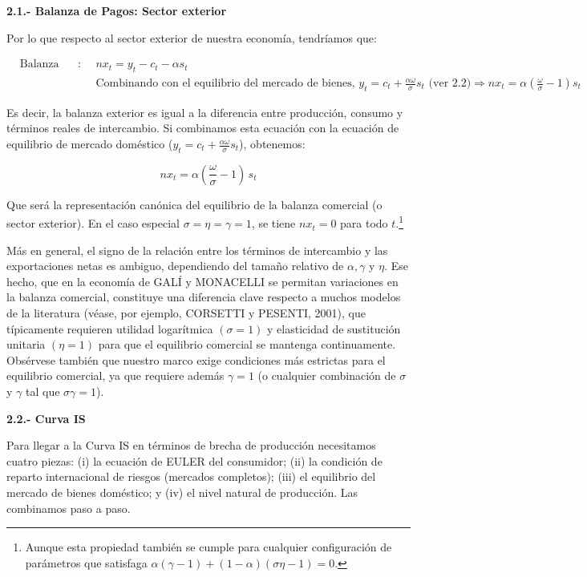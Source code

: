 \documentclass[10pt,a4paper]{article}
\begin{document}
\textbf{2.1.- Balanza de Pagos: Sector exterior}

Por lo que respecto al sector exterior de nuestra economía, tendríamos que:

$$\begin{aligned}
    &\text{Balanza comercial}:&& nx_t = y_t - c_t - \alpha s_t\\[0.5em]
    &&&\text{Combinando con el equilibrio del mercado de bienes, }y_t=c_t+\tfrac{\alpha\omega}{\sigma}s_t\text{ (ver 2.2)}\Longrightarrow \boxed{nx_t=\alpha\left(\frac{\omega}{\sigma}-1\right)s_t}
\end{aligned}$$

Es decir, la balanza exterior es igual a la diferencia entre producción, consumo y términos reales de intercambio. Si combinamos esta ecuación con la ecuación de equilibrio de mercado doméstico ($y_t=c_t+\frac{\alpha\omega}{\sigma}s_t$), obtenemos:

$$nx_t = \alpha\left(\frac{\omega}{\sigma} - 1\right)\, s_t$$

Que será la representación canónica del equilibrio de la balanza comercial (o sector exterior). En el caso especial $\sigma = \eta = \gamma = 1$, se tiene $nx_t = 0$ para todo $t$.\footnote{
  Aunque esta propiedad también se cumple para cualquier configuración de parámetros que satisfaga $\alpha(\gamma - 1) + (1 - \alpha)(\sigma\eta - 1) = 0$.
} 

Más en general, el signo de la relación entre los términos de intercambio y las exportaciones netas es ambiguo, dependiendo del tamaño relativo de $\alpha, \gamma$ y $\eta$. Ese hecho, que en la economía de GALÍ y MONACELLI se permitan variaciones en la balanza comercial, constituye una diferencia clave respecto a muchos modelos de la literatura (véase, por ejemplo, CORSETTI y PESENTI, 2001), que típicamente requieren utilidad logarítmica $(\sigma = 1)$ y elasticidad de sustitución unitaria $(\eta = 1)$ para que el equilibrio comercial se mantenga continuamente. Obsérvese también que nuestro marco exige condiciones más estrictas para el equilibrio comercial, ya que requiere además $\gamma = 1$ (o cualquier combinación de $\sigma$ y $\gamma$ tal que $\sigma \gamma = 1$).


\textbf{2.2.- Curva IS}

Para llegar a la Curva IS en términos de brecha de producción necesitamos cuatro piezas: (i) la ecuación de EULER del consumidor; (ii) la condición de reparto internacional de riesgos (mercados completos); (iii) el equilibrio del mercado de bienes doméstico; y (iv) el nivel natural de producción. Las combinamos paso a paso.
\end{document}
